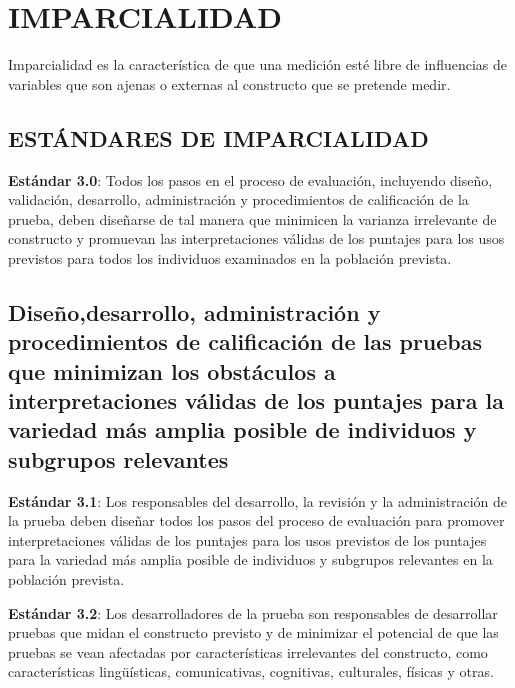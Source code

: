 \documentclass[
  letterpaper,
  DIV=11,
  numbers=noendperiod]{scrreprt}
\begin{document}
\section{IMPARCIALIDAD}

Imparcialidad es la característica de que una medición esté libre de
influencias de variables que son ajenas o externas al constructo que se
pretende medir.

\subsection{ESTÁNDARES DE
IMPARCIALIDAD}\label{estuxe1ndares-de-imparcialidad}

\textbf{Estándar 3.0}: Todos los pasos en el proceso de evaluación,
incluyendo diseño, validación, desarrollo, administración y
procedimientos de calificación de la prueba, deben diseñarse de tal
manera que minimicen la varianza irrelevante de constructo y promuevan
las interpretaciones válidas de los puntajes para los usos previstos
para todos los individuos examinados en la población prevista.

\subsection{Diseño,desarrollo, administración y procedimientos de
calificación de las pruebas que minimizan los obstáculos a
interpretaciones válidas de los puntajes para la variedad más amplia
posible de individuos y subgrupos
relevantes}\label{diseuxf1odesarrollo-administraciuxf3n-y-procedimientos-de-calificaciuxf3n-de-las-pruebas-que-minimizan-los-obstuxe1culos-a-interpretaciones-vuxe1lidas-de-los-puntajes-para-la-variedad-muxe1s-amplia-posible-de-individuos-y-subgrupos-relevantes}

\textbf{Estándar 3.1}: Los responsables del desarrollo, la revisión y la
administración de la prueba deben diseñar todos los pasos del proceso de
evaluación para promover interpretaciones válidas de los puntajes para
los usos previstos de los puntajes para la variedad más amplia posible
de individuos y subgrupos relevantes en la población prevista.

\textbf{Estándar 3.2}: Los desarrolladores de la prueba son responsables
de desarrollar pruebas que midan el constructo previsto y de minimizar
el potencial de que las pruebas se vean afectadas por características
irrelevantes del constructo, como características lingüísticas,
comunicativas, cognitivas, culturales, físicas y otras.
\end{document}

